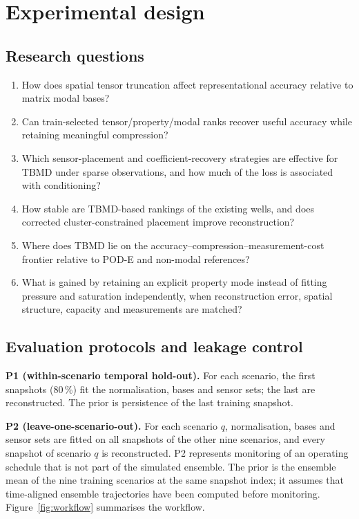 \section{Experimental design}
\label{sec:experiments}

\subsection{Research questions}
\label{sec:rqs}
\begin{enumerate}[label=RQ\arabic*,leftmargin=*]
\item How does spatial tensor truncation affect representational accuracy relative to matrix modal bases?
\item Can train-selected tensor/property/modal ranks recover useful accuracy while retaining meaningful compression?
\item Which sensor-placement and coefficient-recovery strategies are effective for TBMD under sparse observations, and how much of the loss is associated with conditioning?
\item How stable are TBMD-based rankings of the \NWells{} existing wells, and does corrected cluster-constrained placement improve reconstruction?
\item Where does TBMD lie on the accuracy--compression--measurement-cost frontier relative to POD-E and non-modal references?
\item What is gained by retaining an explicit property mode instead of fitting pressure and saturation independently, when reconstruction error, spatial structure, capacity and measurements are matched?
\end{enumerate}

\subsection{Evaluation protocols and leakage control}
\label{sec:protocols}
\textbf{P1 (within-scenario temporal hold-out).} For each scenario, the first \NTrainPOne{} snapshots (80\,\%) fit the normalisation, bases and sensor sets; the last \NTestPOne{} are reconstructed. The prior is persistence of the last training snapshot.

\textbf{P2 (leave-one-scenario-out).} For each scenario $q$, normalisation, bases and sensor sets are fitted on all \NT{} snapshots of the other nine scenarios, and every snapshot of scenario $q$ is reconstructed. P2 represents monitoring of an operating schedule that is not part of the simulated ensemble. The prior is the ensemble mean of the nine training scenarios at the same snapshot index; it assumes that time-aligned ensemble trajectories have been computed before monitoring. Figure~\ref{fig:workflow} summarises the workflow.

